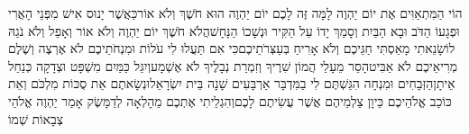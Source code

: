 \documentclass[../main/main.tex]{subfiles}
\begin{document}
\begin{multicols*}{\ncols}
הוֹי הַמִּתְאַוִּים אֶת יוֹם יַהְוֶה לָמָּה זֶּה לָכֶם יוֹם יַהְוֶה הוּא חֹשֶׁךְ וְלֹא אוֹר\PreVerseSpace{}כַּאֲשֶׁר יָנוּס אִישׁ מִפְּנֵי הָאֲרִי וּפְגָעוֹ הַדֹּב וּבָא הַבַּיִת וְסָמַךְ יָדוֹ עַל הַקִּיר וּנְשָׁכוֹ הַנָּחָשׁ\PreVerseSpace{}הֲלֹא חֹשֶׁךְ יוֹם יַהְוֶה וְלֹא אוֹר וְאָפֵל וְלֹא נֹגַהּ לוֹ\PreVerseSpace{}שָׂנֵאתִי מָאַסְתִּי חַגֵּיכֶם וְלֹא אָרִיחַ בְּעַצְּרֹתֵיכֶם\PreVerseSpace{}כִּי אִם תַּעֲלוּ לִי עֹלוֹת וּמִנְחֹתֵיכֶם לֹא אֶרְצֶה וְשֶׁלֶם מְרִיאֵיכֶם לֹא אַבִּיט\PreVerseSpace{}הָסֵר מֵעָלַי הֲמוֹן שִׁרֶיךָ וְזִמְרַת נְבָלֶיךָ לֹא אֶשְׁמָע\PreVerseSpace{}וְיִגַּל כַּמַּיִם מִשְׁפָּט וּצְדָקָה כְּנַחַל אֵיתָן\PreVerseSpace{}הַזְּבָחִים וּמִנְחָה הִגַּשְׁתֶּם לִי בַמִּדְבָּר אַרְבָּעִים שָׁנָה בֵּית יִשְׂרָאֵל\PreVerseSpace{}וּנְשָׂאתֶם אֵת סֻכּוֹת\SubEnd{} מִלְכֹּם\SubEnd{} וְאֵת כּוֹכַב אֱלֹהֵיכֶם כֵּיוָן צַלְמֵיהֶם\SubEnd{} אֲשֶׁר עֲשִׂיתֶם לָכֶם\PreVerseSpace{}וְהִגְלֵיתִי אֶתְכֶם מֵהָלְאָה לְדַמָּשֶׂק אָמַר יַהְוֶה אֱלֹהֵי צְבָאוֹת שְׁמוֹ\OpenSection{}\par

\end{multicols*}
\end{document}
